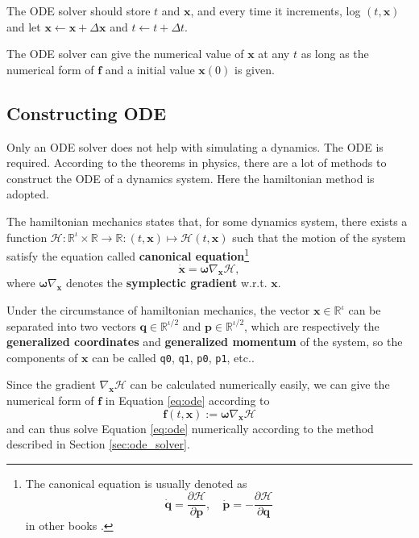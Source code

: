 \documentclass[12pt]{article}
\begin{document}
The ODE solver should store $t$ and $\mathbf x$,
and every time it increments, log $\left(t,\mathbf x\right)$ and
let $\mathbf x\leftarrow\mathbf x+\Delta\mathbf x$ and $t\leftarrow t+\Delta t$.

The ODE solver can give the numerical value of $\mathbf x$ at any $t$
as long as the numerical form of $\mathbf f$
and a initial value $\mathbf x\left(0\right)$
is given.

\subsection{Constructing ODE}

Only an ODE solver does not help with simulating a dynamics.
The ODE is required.
According to the theorems in physics,
there are a lot of methods to construct the ODE of a dynamics system.
Here the hamiltonian method is adopted.

The hamiltonian mechanics states that, for some dynamics system,
there exists a function
$\mathcal H:\mathbb R^\iota\times\mathbb R\rightarrow\mathbb R:\left(t,\mathbf x\right)\mapsto\mathcal H\left(t,\mathbf x\right)$
such that the motion of the system satisfy the equation
called \textbf{canonical equation}\footnote{
  The canonical equation is usually denoted as
  \begin{equation*}
    \dot{\mathbf q}=\frac{\partial\mathcal H}{\partial\mathbf p},
    \quad
    \dot{\mathbf p}=-\frac{\partial\mathcal H}{\partial\mathbf q}
  \end{equation*}
  in other books \cite{hand2008mechanics}\cite[p. 65]{arnold1989mathmech}\cite[p. 132]{landau1976mechanics}.
}
\begin{equation}
  \dot{\mathbf x}=\boldsymbol\omega\nabla_{\mathbf x}\mathcal H,
\end{equation}
where $\boldsymbol\omega\nabla_{\mathbf x}$ denotes the \textbf{symplectic gradient} w.r.t. $\mathbf x$.

Under the circumstance of hamiltonian mechanics,
the vector $\mathbf x\in\mathbb R^\iota$ can be separated into two vectors
$\mathbf q\in\mathbb R^{\iota/2}$ and $\mathbf p\in\mathbb R^{\iota/2}$,
which are respectively the \textbf{generalized coordinates} and \textbf{generalized momentum} of the system,
so the components of $\mathbf x$ can be called \verb!q0!, \verb!q1!, \verb!p0!, \verb!p1!, etc..

Since the gradient $\nabla_{\mathbf x}\mathcal H$ can be calculated numerically easily,
we can give the numerical form of $\mathbf f$ in Equation \ref{eq:ode} according to
\begin{equation}
  \mathbf f\left(t,\mathbf x\right):=\boldsymbol\omega\nabla_{\mathbf x}\mathcal H
\end{equation}
and can thus solve Equation \ref{eq:ode} numerically according to the method described in Section \ref{sec:ode_solver}.
\end{document}
